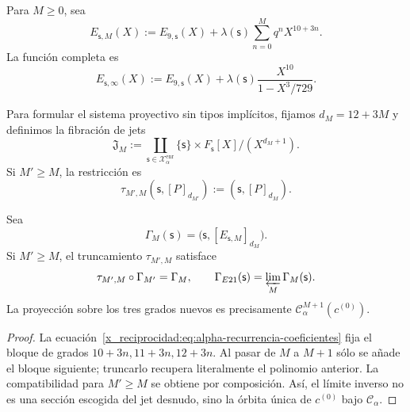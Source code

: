 Para \(M\geq0\), sea
\begin{equation}
 E_{\mathsf s,M}(X):=E_{9,\mathsf s}(X)
 +\lambda(\mathsf s)\sum_{n=0}^{M}q^nX^{10+3n}.
 \label{x_reciprocidad:eq:alpha-truncamientos-completos}
\end{equation}
La función completa es
\begin{equation}
 E_{\mathsf s,\infty}(X)
 :=E_{9,\mathsf s}(X)
 +\lambda(\mathsf s)\frac{X^{10}}{1-X^3/729}.
 \label{x_reciprocidad:eq:alpha-funcion-completa-explicita}
\end{equation}

Para formular el sistema proyectivo sin tipos implícitos, fijamos
\(d_M=12+3M\) y definimos la fibración de jets
\begin{equation}
 \mathfrak J_M:=
 \coprod_{\mathsf s\in\mathcal X_\alpha^{\mathrm{enr}}}
 \{\mathsf s\}\times F_{\mathsf s}[X]/(X^{d_M+1}).
 \label{x_reciprocidad:eq:alpha-espacio-jets-rev08}
\end{equation}
Si \(M'\ge M\), la restricción es
\begin{equation}
 \tau_{M',M}(\mathsf s,[P]_{d_{M'}})
 :=(\mathsf s,[P]_{d_M}).
 \label{x_reciprocidad:eq:alpha-truncamiento-jets-rev08}
\end{equation}

\begin{proposition}
\label{x_reciprocidad:prop:alpha-naturalidad-recurrencia-explicita}
Sea
\[
 \Gamma_M(\mathsf s)
 =\bigl(\mathsf s,[E_{\mathsf s,M}]_{d_M}\bigr).
\]
Si \(M'\geq M\), el truncamiento \(\tau_{M',M}\) satisface
\begin{equation}
 \tau_{M',M}\circ\Gamma_{M'}=\Gamma_M,
 \qquad
 \Gamma_{E21}(\mathsf s)=\varprojlim_M\Gamma_M(\mathsf s).
 \label{x_reciprocidad:eq:alpha-naturalidad-explicita}
\end{equation}
La proyección sobre los tres grados nuevos es precisamente
\(\mathcal C_\alpha^{M+1}(c^{(0)})\).
\end{proposition}

\begin{proof}
La ecuación~\eqref{x_reciprocidad:eq:alpha-recurrencia-coeficientes} fija el bloque de
grados \(10+3n,11+3n,12+3n\). Al pasar de \(M\) a \(M+1\) sólo se añade
el bloque siguiente; truncarlo recupera literalmente el polinomio anterior.
La compatibilidad para \(M'\geq M\) se obtiene por composición. Así, el
límite inverso no es una sección escogida del jet desnudo, sino la órbita
única de \(c^{(0)}\) bajo \(\mathcal C_\alpha\).
\end{proof}

